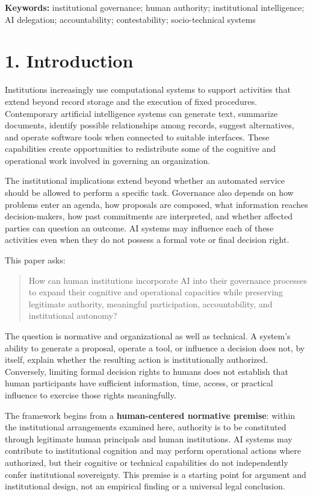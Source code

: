 \documentclass[
  10pt,
]{article}
\begin{document}
\textbf{Keywords:} institutional governance; human authority;
institutional intelligence; AI delegation; accountability;
contestability; socio-technical systems

\section{1. Introduction}\label{introduction}

Institutions increasingly use computational systems to support
activities that extend beyond record storage and the execution of fixed
procedures. Contemporary artificial intelligence systems can generate
text, summarize documents, identify possible relationships among
records, suggest alternatives, and operate software tools when connected
to suitable interfaces. These capabilities create opportunities to
redistribute some of the cognitive and operational work involved in
governing an organization.

The institutional implications extend beyond whether an automated
service should be allowed to perform a specific task. Governance also
depends on how problems enter an agenda, how proposals are composed,
what information reaches decision-makers, how past commitments are
interpreted, and whether affected parties can question an outcome. AI
systems may influence each of these activities even when they do not
possess a formal vote or final decision right.

This paper asks:

\begin{quote}
How can human institutions incorporate AI into their governance
processes to expand their cognitive and operational capacities while
preserving legitimate authority, meaningful participation,
accountability, and institutional autonomy?
\end{quote}

The question is normative and organizational as well as technical. A
system's ability to generate a proposal, operate a tool, or influence a
decision does not, by itself, explain whether the resulting action is
institutionally authorized. Conversely, limiting formal decision rights
to humans does not establish that human participants have sufficient
information, time, access, or practical influence to exercise those
rights meaningfully.

The framework begins from a \textbf{human-centered normative premise}:
within the institutional arrangements examined here, authority is to be
constituted through legitimate human principals and human institutions.
AI systems may contribute to institutional cognition and may perform
operational actions where authorized, but their cognitive or technical
capabilities do not independently confer institutional sovereignty. This
premise is a starting point for argument and institutional design, not
an empirical finding or a universal legal conclusion.
\end{document}
